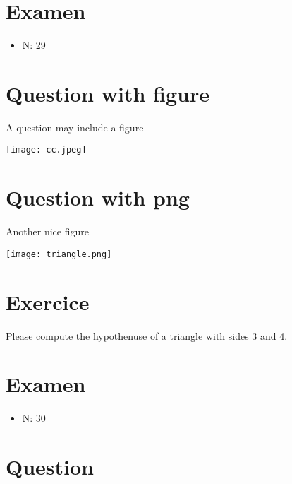 \documentclass[a4paper,11pt,twoside]{article}
\begin{document}
\cleardoublepage

\section*{Examen}
\label{sec:org3ee15ef}
\begin{itemize}
\item N: 29
\end{itemize}
\section*{Question with figure}
\label{sec:org750dda6}


A question may include a figure

\begin{center}
\texttt{[image: cc.jpeg]}
\end{center}



\section*{Question with png}
\label{sec:org0b815ee}

Another nice figure

\begin{center}
\texttt{[image: triangle.png]}
\end{center}



\section*{Exercice}
\label{sec:org9834ee0}

Please compute the hypothenuse of a triangle with sides 3 and 4.



\subsection*{}
\label{sec:org0d78af0}

\cleardoublepage

\section*{Examen}
\label{sec:orgbabf777}
\begin{itemize}
\item N: 30
\end{itemize}
\section*{Question}
\label{sec:org4bed427}
\end{document}
